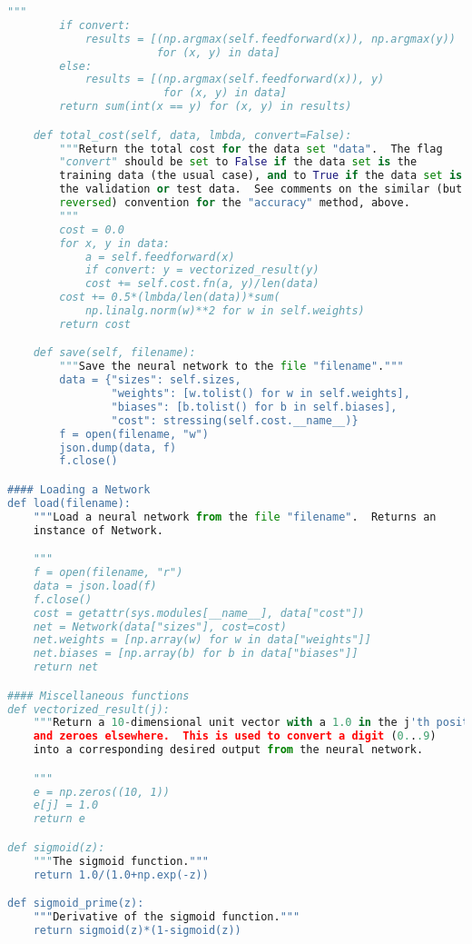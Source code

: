 \begin{fullwidth}
\begin{lstlisting}[caption={network2.py (Python 2.7)},label={lst:network2.py}, language=Python]
        """
        if convert:
            results = [(np.argmax(self.feedforward(x)), np.argmax(y))
                       for (x, y) in data]
        else:
            results = [(np.argmax(self.feedforward(x)), y)
                        for (x, y) in data]
        return sum(int(x == y) for (x, y) in results)

    def total_cost(self, data, lmbda, convert=False):
        """Return the total cost for the data set "data".  The flag
        "convert" should be set to False if the data set is the
        training data (the usual case), and to True if the data set is
        the validation or test data.  See comments on the similar (but
        reversed) convention for the "accuracy" method, above.
        """
        cost = 0.0
        for x, y in data:
            a = self.feedforward(x)
            if convert: y = vectorized_result(y)
            cost += self.cost.fn(a, y)/len(data)
        cost += 0.5*(lmbda/len(data))*sum(
            np.linalg.norm(w)**2 for w in self.weights)
        return cost

    def save(self, filename):
        """Save the neural network to the file "filename"."""
        data = {"sizes": self.sizes,
                "weights": [w.tolist() for w in self.weights],
                "biases": [b.tolist() for b in self.biases],
                "cost": stressing(self.cost.__name__)}
        f = open(filename, "w")
        json.dump(data, f)
        f.close()

#### Loading a Network
def load(filename):
    """Load a neural network from the file "filename".  Returns an
    instance of Network.

    """
    f = open(filename, "r")
    data = json.load(f)
    f.close()
    cost = getattr(sys.modules[__name__], data["cost"])
    net = Network(data["sizes"], cost=cost)
    net.weights = [np.array(w) for w in data["weights"]]
    net.biases = [np.array(b) for b in data["biases"]]
    return net

#### Miscellaneous functions
def vectorized_result(j):
    """Return a 10-dimensional unit vector with a 1.0 in the j'th position
    and zeroes elsewhere.  This is used to convert a digit (0...9)
    into a corresponding desired output from the neural network.

    """
    e = np.zeros((10, 1))
    e[j] = 1.0
    return e

def sigmoid(z):
    """The sigmoid function."""
    return 1.0/(1.0+np.exp(-z))

def sigmoid_prime(z):
    """Derivative of the sigmoid function."""
    return sigmoid(z)*(1-sigmoid(z))
\end{lstlisting}
\end{fullwidth}

